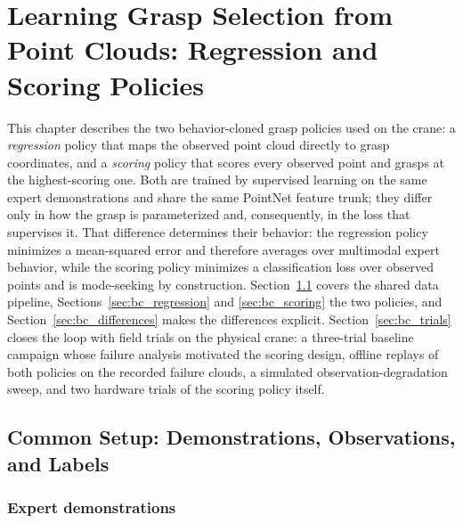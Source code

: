 
\chapter[Learning Grasp Selection from Point Clouds]{Learning Grasp Selection from Point Clouds: Regression and Scoring Policies}
\label{ch:bc_policies}

This chapter describes the two behavior-cloned grasp policies used on the crane:
a \emph{regression} policy that maps the observed point cloud directly to grasp
coordinates, and a \emph{scoring} policy that scores every observed point and
grasps at the highest-scoring one. Both are trained by supervised learning on
the same expert demonstrations and share the same PointNet feature trunk; they
differ only in how the grasp is parameterized and, consequently, in the loss
that supervises it. That difference determines their behavior: the regression
policy minimizes a mean-squared error and therefore averages over multimodal
expert behavior, while the scoring policy minimizes a classification loss over
observed points and is mode-seeking by construction. Section~\ref{sec:bc_common}
covers the shared data pipeline, Sections~\ref{sec:bc_regression} and
\ref{sec:bc_scoring} the two policies, and Section~\ref{sec:bc_differences}
makes the differences explicit. Section~\ref{sec:bc_trials} closes the loop
with field trials on the physical crane: a three-trial baseline campaign whose
failure analysis motivated the scoring design, offline replays of both
policies on the recorded failure clouds, a simulated observation-degradation
sweep, and two hardware trials of the scoring policy itself.

\section{Common Setup: Demonstrations, Observations, and Labels}
\label{sec:bc_common}

\subsection{Expert demonstrations}

